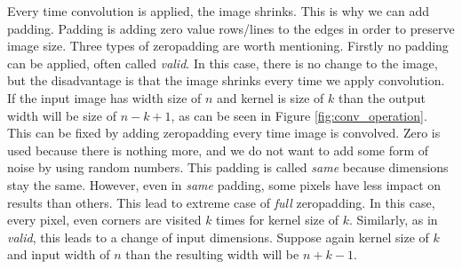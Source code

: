 \documentclass[thesis=B,english]{FITthesis}[2019/12/23]
\begin{document}
     Every time convolution is applied, the image shrinks. This is why we can add padding. Padding is adding zero value rows/lines to the edges in order to preserve image size. Three types of zeropadding are worth mentioning. Firstly no padding can be applied, often called \emph{valid}. In this case, there is no change to the image, but the disadvantage is that the image shrinks every time we apply convolution. If the input image has width size of $n$ and kernel is size of $k$ than the output width will be size of $n - k + 1$, as can be seen in Figure \ref{fig:conv_operation}. This can be fixed by adding zeropadding every time image is convolved. Zero is used because there is nothing more, and we do not want to add some form of noise by using random numbers. This padding is called \emph{same} because dimensions stay the same. However, even in \emph{same} padding, some pixels have less impact on results than others. This lead to extreme case of \emph{full} zeropadding. In this case, every pixel, even corners are visited $k$ times for kernel size of $k$. Similarly, as in \emph{valid}, this leads to a change of input dimensions. Suppose again kernel size of $k$ and input width of $n$ than the resulting width will be $n + k - 1$. \cite{bengio2017deep}
    
\end{document}
